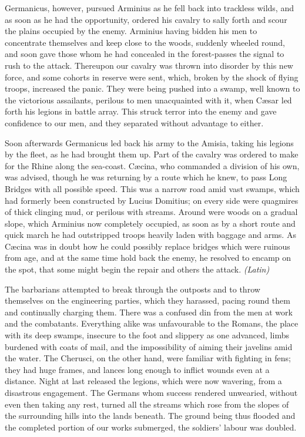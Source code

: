 
Germanicus, however, pursued Arminius as he fell back into trackless wilds, and as soon as he had the opportunity, ordered his cavalry to sally forth and scour the plains occupied by the enemy. Arminius having bidden his men to concentrate themselves and keep close to the woods, suddenly wheeled round, and soon gave those whom he had concealed in the forest-passes the signal to rush to the attack. Thereupon our cavalry was thrown into disorder by this new force, and some cohorts in reserve were sent, which, broken by the shock of flying troops, increased the panic. They were being pushed into a swamp, well known to the victorious assailants, perilous to men unacquainted with it, when Cæsar led forth his legions in battle array. This struck terror into the enemy and gave confidence to our men, and they separated without advantage to either.

Soon afterwards Germanicus led back his army to the Amisia, taking his legions by the fleet, as he had brought them up. Part of the cavalry was ordered to make for the Rhine along the sea-coast. Cæcina, who commanded a division of his own, was advised, though he was returning by a route which he knew, to pass Long Bridges with all possible speed. This was a narrow road amid vast swamps, which had formerly been constructed by Lucius Domitius; on every side were quagmires of thick clinging mud, or perilous with streams. Around were woods on a gradual slope, which Arminius now completely occupied, as soon as by a short route and quick march he had outstripped troops heavily laden with baggage and arms. As Cæcina was in doubt how he could possibly replace bridges which were ruinous from age, and at the same time hold back the enemy, he resolved to encamp on the spot, that some might begin the repair and others the attack. \emph{(Latin)}


The barbarians attempted to break through the outposts and to throw themselves on the engineering parties, which they harassed, pacing round them and continually charging them. There was a confused din from the men at work and the combatants. Everything alike was unfavourable to the Romans, the place with its deep swamps, insecure to the foot and slippery as one advanced, limbs burdened with coats of mail, and the impossibility of aiming their javelins amid the water. The Cherusci, on the other hand, were familiar with fighting in fens; they had huge frames, and lances long enough to inflict wounds even at a distance. Night at last released the legions, which were now wavering, from a disastrous engagement. The Germans whom success rendered unwearied, without even then taking any rest, turned all the streams which rose from the slopes of the surrounding hills into the lands beneath. The ground being thus flooded and the completed portion of our works submerged, the soldiers' labour was doubled.

